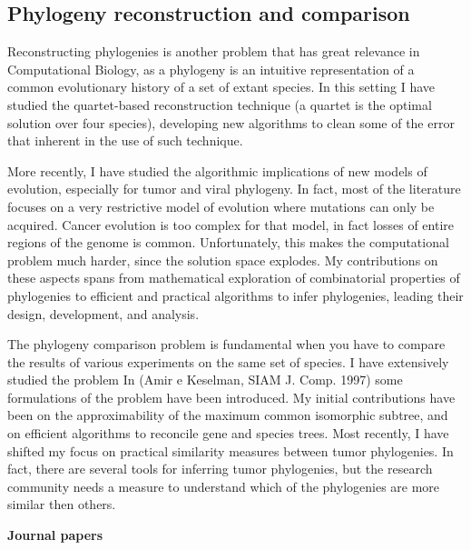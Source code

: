 \documentclass[11pt,a4paper,roman]{moderncv}
\begin{document}
\subsection{Phylogeny reconstruction and
comparison}\label{phylogeny-reconstruction-and-comparison}

Reconstructing phylogenies is another problem that has great relevance
in Computational Biology, as a phylogeny is an intuitive representation
of a common evolutionary history of a set of extant species. In this
setting I have studied the quartet-based reconstruction technique (a
quartet is the optimal solution over four species), developing new
algorithms to clean some of the error that inherent in the use of such
technique.

More recently, I have studied the algorithmic implications of new models of
evolution, especially for tumor and viral phylogeny.
In fact, most of the literature focuses on a very restrictive model of evolution
where mutations can only be acquired.
Cancer evolution is too complex for that model, in fact losses of entire regions
of the genome is common.
Unfortunately, this makes the computational problem much harder, since the
solution space explodes.
My contributions on these aspects spans from mathematical exploration of
combinatorial properties of phylogenies to efficient and practical algorithms to
infer phylogenies, leading their design, development, and analysis.


The phylogeny comparison problem is fundamental when you have to compare
the results of various experiments on the same set of species. I have
extensively studied the problem In (Amir e Keselman, SIAM J. Comp. 1997)
some formulations of the problem have been introduced. My initial contributions
have been on the approximability of the maximum common isomorphic
subtree, and on efficient algorithms to reconcile gene and species trees.
Most recently, I have shifted my focus on practical similarity measures between
tumor phylogenies.
In fact, there are several tools for inferring tumor phylogenies, but the
research community needs a measure to understand which of the phylogenies are
more similar then others.


\textbf{Journal papers}

\cite{DBLP:journals/jcb/AliCLVP21}
\cite{DBLP:journals/bioinformatics/CiccolellaRGPSB21}
\cite{DBLP:journals/bioinformatics/CiccolellaBDBPV21}
\cite{DBLP:journals/bmcbi/CiccolellaGPVHB20}
\cite{DBLP:journals/tcbb/BonizzoniCVS19}
\cite{DBLP:journals/tcs/BonizzoniCVRT17}
\cite{DBLP:journals/fuin/BonizzoniCVRT17}
\cite{bonizzoniExplainingEvolutionConstrained2014}
\cite{DBLP:journals/tcs/BonizzoniVD05}
\cite{DBLP:journals/bioinformatics/VedovaW02}
\cite{DBLP:journals/ijfcs/BonizzoniVM00}
\end{document}

